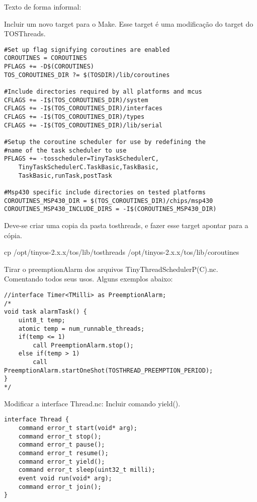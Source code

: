 Texto de forma informal:
\begin{description}
\item Incluir um novo target para o Make. Esse target é uma modificação do target do TOSThreads. 
\begin{lstlisting}
#Set up flag signifying coroutines are enabled
COROUTINES = COROUTINES
PFLAGS += -D$(COROUTINES)
TOS_COROUTINES_DIR ?= $(TOSDIR)/lib/coroutines

#Include directories required by all platforms and mcus
CFLAGS += -I$(TOS_COROUTINES_DIR)/system
CFLAGS += -I$(TOS_COROUTINES_DIR)/interfaces
CFLAGS += -I$(TOS_COROUTINES_DIR)/types
CFLAGS += -I$(TOS_COROUTINES_DIR)/lib/serial

#Setup the coroutine scheduler for use by redefining the 
#name of the task scheduler to use
PFLAGS += -tosscheduler=TinyTaskSchedulerC,
    TinyTaskSchedulerC.TaskBasic,TaskBasic,
    TaskBasic,runTask,postTask

#Msp430 specific include directories on tested platforms
COROUTINES_MSP430_DIR = $(TOS_COROUTINES_DIR)/chips/msp430
COROUTINES_MSP430_INCLUDE_DIRS = -I$(COROUTINES_MSP430_DIR)
\end{lstlisting}

\item Deve-se criar uma copia da pasta tosthreads, e fazer esse target apontar para a cópia.
\begin{verbose}
cp /opt/tinyos-2.x.x/tos/lib/tosthreads /opt/tinyos-2.x.x/tos/lib/coroutines
\end{verbose}

\item Tirar o preemptionAlarm dos arquivos TinyThreadSchedulerP(C).nc. Comentando todos seus usos. Alguns exemplos abaixo:
\begin{lstlisting}
//interface Timer<TMilli> as PreemptionAlarm;
/*
void task alarmTask() {
    uint8_t temp;
    atomic temp = num_runnable_threads;
    if(temp <= 1)
        call PreemptionAlarm.stop();
    else if(temp > 1)
        call PreemptionAlarm.startOneShot(TOSTHREAD_PREEMPTION_PERIOD);
}
*/
\end{lstlisting}

\item Modificar a interface Thread.nc: Incluir comando yield().
\begin{lstlisting}
interface Thread {
    command error_t start(void* arg);
    command error_t stop();
    command error_t pause();
    command error_t resume();
    command error_t yield();
    command error_t sleep(uint32_t milli);
    event void run(void* arg);
    command error_t join();
}
\end{lstlisting}


\end{description}
